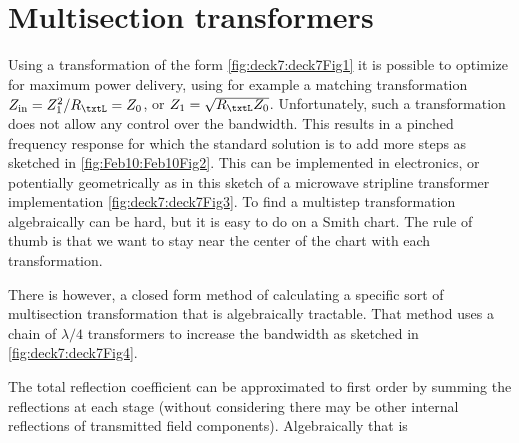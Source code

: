 %
%
\section{Multisection transformers}
Using a transformation of the form \cref{fig:deck7:deck7Fig1} it is possible to optimize for maximum power delivery, using for example a matching transformation \( Z_{\textrm{in}} = Z_1^2/R_\txtL = Z_0\), or \( Z_1 = \sqrt{R_\txtL Z_0} \).  Unfortunately, such a transformation does not allow any control over the bandwidth.  This results in a pinched frequency response for which the standard solution is to add more steps as sketched in \cref{fig:Feb10:Feb10Fig2}.
This can be implemented in electronics, or potentially geometrically as in this sketch of a microwave stripline transformer implementation \cref{fig:deck7:deck7Fig3}.
To find a multistep transformation algebraically can be hard, but it is easy to do on a Smith chart.  The rule of thumb is that we want to stay near the center of the chart with each transformation.

There is however, a closed form method of calculating a specific sort of multisection transformation that is algebraically tractable.  That method uses a chain of \( \lambda/4 \) transformers to increase the bandwidth as sketched in \cref{fig:deck7:deck7Fig4}.

The total reflection coefficient can be approximated to first order by summing the reflections at each stage (without considering there may be other internal reflections of transmitted field components).  Algebraically that is

